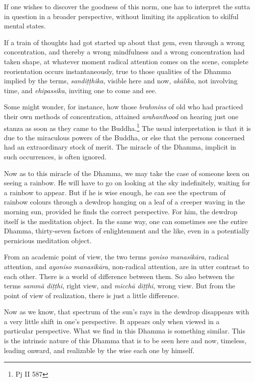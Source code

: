 If one wishes to discover the goodness of this norm, one has to interpret the sutta in question in a broader perspective, without limiting its application to skilful mental states.

If a train of thoughts had got started up about that gem, even through a wrong concentration, and thereby a wrong mindfulness and a wrong concentration had taken shape, at whatever moment radical attention comes on the scene, complete reorientation occurs instantaneously, true to those qualities of the Dhamma implied by the terms, \emph{sandiṭṭhika}, visible here and now, \emph{akālika}, not involving time, and \emph{ehipassika}, inviting one to come and see.

Some might wonder, for instance, how those \emph{brahmins} of old who had practiced their own methods of concentration, attained \emph{arahanthood} on hearing just one stanza as soon as they came to the Buddha.\footnote{Pj II 587} The usual interpretation is that it is due to the miraculous powers of the Buddha, or else that the persons concerned had an extraordinary stock of merit. The miracle of the Dhamma, implicit in such occurrences, is often ignored.

Now as to this miracle of the Dhamma, we may take the case of someone keen on seeing a rainbow. He will have to go on looking at the sky indefinitely, waiting for a rainbow to appear. But if he is wise enough, he can see the spectrum of rainbow colours through a dewdrop hanging on a leaf of a creeper waving in the morning sun, provided he finds the correct perspective. For him, the dewdrop itself is the meditation object. In the same way, one can sometimes see the entire Dhamma, thirty-seven factors of enlightenment and the like, even in a potentially pernicious meditation object.

From an academic point of view, the two terms \emph{yoniso manasikāra}, radical attention, and \emph{ayoniso manasikāra}, non-radical attention, are in utter contrast to each other. There is a world of difference between them. So also between the terms \emph{sammā diṭṭhi}, right view, and \emph{micchā diṭṭhi}, wrong view. But from the point of view of realization, there is just a little difference.

Now as we know, that spectrum of the sun's rays in the dewdrop disappears with a very little shift in one's perspective. It appears only when viewed in a particular perspective. What we find in this Dhamma is something similar. This is the intrinsic nature of this Dhamma that is to be seen here and now, timeless, leading onward, and realizable by the wise each one by himself.

